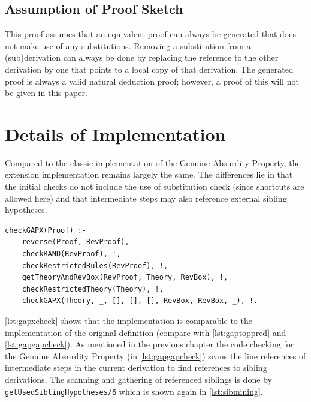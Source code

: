 \documentclass[11pt,twoside,a4paper]{report}
\begin{document}
\subsection{Assumption of Proof Sketch}
This proof assumes that an equivalent proof can always be generated that does not make use of any substitutions. Removing a substitution from a (sub)derivation can always be done by replacing the reference to the other derivation by one that points to a local copy of that derivation. The generated proof is always a valid natural deduction proof; however, a proof of this will not be given in this paper.

\section{Details of Implementation}
Compared to the classic implementation of the Genuine Absurdity Property, the extension implementation remains largely the same. The differences lie in that the initial checks do not include the use of substitution check (since shortcuts are allowed here) and that intermediate steps may also reference external sibling hypotheses.

\begin{lstlisting}[caption={Checking whether a proof is follows the extended Genuine Absurdity Property},label=lst:gapxcheck]
% Checks that the given proof follows the extended GAP property
checkGAPX(Proof) :- 
	reverse(Proof, RevProof), 
	checkRAND(RevProof), !,
	checkRestrictedRules(RevProof), !,
	getTheoryAndRevBox(RevProof, Theory, RevBox), !,
	checkRestrictedTheory(Theory), !,
	checkGAPX(Theory, _, [], [], [], RevBox, RevBox, _), !.
\end{lstlisting}

\autoref{lst:gapxcheck} shows that the implementation is comparable to the implementation of the original definition (compare with \autoref{lst:gaptoppred} and \autoref{lst:gapgapcheck}). As mentioned in the previous chapter the code checking for the Genuine Absurdity Property (in \autoref{lst:gapgapcheck}) scans the line references of intermediate steps in the current derivation to find references to sibling derivations. The scanning and gathering of referenced siblings is done by \lstinline$getUsedSiblingHypotheses/6$ which is shown again in \autoref{lst:sibmining}.
\end{document}

